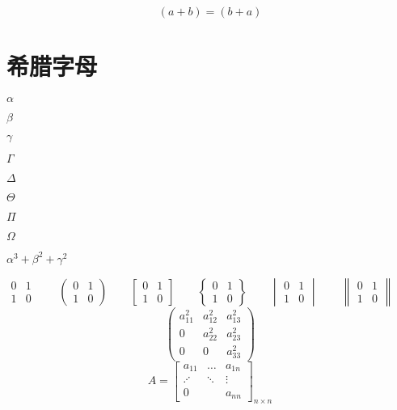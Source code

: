 \documentclass{ctexart}
\begin{document}
	\begin{equation}
		(a+b)=(b+a)
	\end{equation}
	\section{希腊字母}
	$\alpha$
	
	$\beta$
	
	$\gamma$
	
	$\Gamma$
	
	$\Delta$
	
	$\Theta$
	
	$\Pi$
	
	$\Omega$
	
	$\alpha^3+\beta^2+\gamma^2$
	
	\[
	\begin{matrix}
		0 & 1\\
		1 & 0
	\end{matrix} \qquad
	\begin{pmatrix}
		0 & 1\\
		1 & 0
	\end{pmatrix} \qquad
	\begin{bmatrix}
		0 & 1\\
		1 & 0
	\end{bmatrix} \qquad
	\begin{Bmatrix}
	0 & 1\\
	1 & 0
	\end{Bmatrix} \qquad
	\begin{vmatrix}
	0 & 1\\
	1 & 0
	\end{vmatrix} \qquad
	\begin{Vmatrix}
	0 & 1\\
	1 & 0
	\end{Vmatrix} \qquad
	\]
	\[
	\begin{pmatrix}
		a_{11}^2 & a_{12}^2 & a_{13}^2\\
		0 & a_{22}^2 & a_{23}^2 \\
		0 & 0 & a_{33}^2
	\end{pmatrix}
	\]
	\[
		A=\begin{bmatrix}
			a_{11} & \dots & a_{1n} \\
			\iddots & \ddots & \vdots \\
			0 & & a_{nn}
		\end{bmatrix}_{n \times n}
	\]
	
\end{document}
